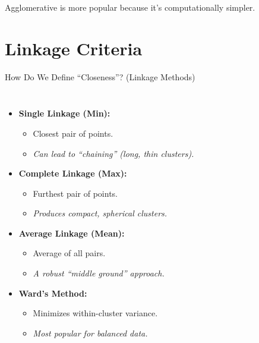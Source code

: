 \documentclass{beamer}
\begin{document}
\begin{frame}
    \centering
    \begin{tcolorbox}[colback=white, colframe=mygreen, title=Which is more common?]
        \textcolor{myorange}{Agglomerative} is more popular because it's computationally simpler.
    \end{tcolorbox}
\end{frame}
\section{Linkage Criteria}
\begin{frame}{How Do We Define ``Closeness''? (Linkage Methods)}
    \begin{columns}
            \begin{itemize}
                \item<1-> \textbf{Single Linkage (Min):}
                    \begin{itemize}
                        \item Closest pair of points.
                        \item \textit{Can lead to ``chaining'' (long, thin clusters).}
                    \end{itemize}
                \item<2-> \textbf{Complete Linkage (Max):}
                    \begin{itemize}
                        \item Furthest pair of points.
                        \item \textit{Produces compact, spherical clusters.}
                    \end{itemize}
                \item<3-> \textbf{Average Linkage (Mean):}
                    \begin{itemize}
                        \item Average of all pairs.
                        \item \textit{A robust ``middle ground'' approach.}
                    \end{itemize}
                \item<4-> \textbf{Ward's Method:}
                    \begin{itemize}
                        \item Minimizes within-cluster variance.
                        \item \textit{Most popular for balanced data.}
                    \end{itemize}
            \end{itemize}


\end{columns}
\end{frame}
\end{document}
